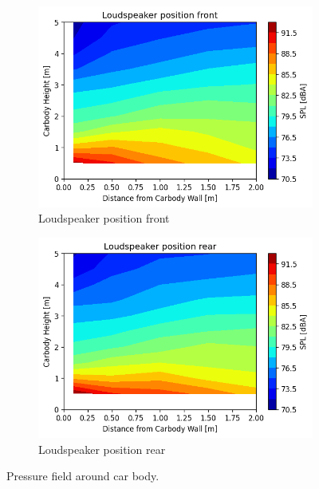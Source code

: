 \begin{figure}[H]
    \centering
     \begin{subfigure}[b]{0.49\textwidth}
        \centering
        \includegraphics[width=\textwidth]{fig/pressure_field_loudspeaker_front.png}
        \caption{Loudspeaker position front}
    \end{subfigure}
    \begin{subfigure}[b]{0.49\textwidth}
        \centering
        \includegraphics[width=\textwidth]{fig/pressure_field_loudspeaker_rear.png}
        \caption{Loudspeaker position rear}
    \end{subfigure}
        \caption{Pressure field around car body.}
        \label{fig:pressurefield}
\end{figure}


